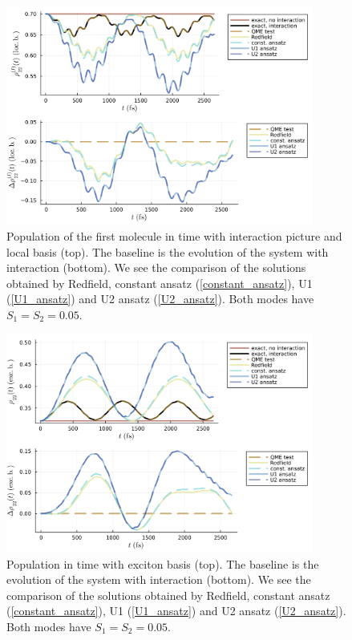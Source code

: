 \newpage
\begin{figure}[H]
\centering
\includegraphics[width=0.9\textwidth]{img/ansatz/ansatz03_joined_intloc22.png}
\caption{Population of the first molecule in time with interaction picture and local basis (top). The baseline is the evolution of the system with interaction (bottom). We see the comparison of the solutions obtained by Redfield, constant ansatz (\ref{constant_ansatz}), U1 (\ref{U1_ansatz}) and U2 ansatz (\ref{U2_ansatz}). Both modes have $S_1=S_2=0.05$. }
\label{img:ansatz03_joined_intloc22}
\end{figure}

\begin{figure}[H]
\centering
\includegraphics[width=0.9\textwidth]{img/ansatz/ansatz03_joined_schexc22.png}
\caption{Population in time with exciton basis (top). The baseline is the evolution of the system with interaction (bottom). We see the comparison of the solutions obtained by Redfield, constant ansatz (\ref{constant_ansatz}), U1 (\ref{U1_ansatz}) and U2 ansatz (\ref{U2_ansatz}). Both modes have $S_1=S_2=0.05$. }
\label{img:ansatz03_joined_schexc22}
\end{figure}

